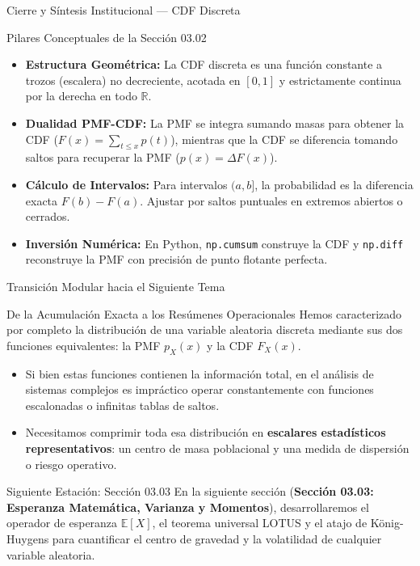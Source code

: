 \documentclass[10pt, aspectratio=169]{beamer}
\begin{document}
\begin{frame}{Cierre y Síntesis Institucional — CDF Discreta}
  \fontsize{7.5pt}{9pt}\selectfont
  \begin{block}{Pilares Conceptuales de la Sección 03.02}
    \fontsize{7.5pt}{9pt}\selectfont
    \begin{itemize}\itemsep=0.12cm
      \item \textbf{Estructura Geométrica:} La CDF discreta es una función constante a trozos (escalera) no decreciente, acotada en $[0,1]$ y estrictamente continua por la derecha en todo $\mathbb{R}$.
      \item \textbf{Dualidad PMF-CDF:} La PMF se integra sumando masas para obtener la CDF ($F(x) = \sum_{t \le x} p(t)$), mientras que la CDF se diferencia tomando saltos para recuperar la PMF ($p(x) = \Delta F(x)$).
      \item \textbf{Cálculo de Intervalos:} Para intervalos $(a, b]$, la probabilidad es la diferencia exacta $F(b) - F(a)$. Ajustar por saltos puntuales en extremos abiertos o cerrados.
      \item \textbf{Inversión Numérica:} En Python, \texttt{np.cumsum} construye la CDF y \texttt{np.diff} reconstruye la PMF con precisión de punto flotante perfecta.
    \end{itemize}
  \end{block}
\end{frame}

\begin{frame}{Transición Modular hacia el Siguiente Tema}
  \fontsize{7.5pt}{9pt}\selectfont
  \begin{block}{De la Acumulación Exacta a los Resúmenes Operacionales}
    \fontsize{7.5pt}{9pt}\selectfont
    Hemos caracterizado por completo la distribución de una variable aleatoria discreta mediante sus dos funciones equivalentes: la PMF $p_X(x)$ y la CDF $F_X(x)$.
    \begin{itemize}\itemsep=0.12cm
      \item Si bien estas funciones contienen la información total, en el análisis de sistemas complejos es impráctico operar constantemente con funciones escalonadas o infinitas tablas de saltos.
      \item Necesitamos comprimir toda esa distribución en \textbf{escalares estadísticos representativos}: un centro de masa poblacional y una medida de dispersión o riesgo operativo.
    \end{itemize}
  \end{block}
  \vspace{-0.15cm}
  \pause
  \begin{alertblock}{Siguiente Estación: Sección 03.03}
    \fontsize{7.5pt}{9pt}\selectfont
    En la siguiente sección (\textbf{Sección 03.03: Esperanza Matemática, Varianza y Momentos}), desarrollaremos el operador de esperanza $\mathbb{E}[X]$, el teorema universal LOTUS y el atajo de König-Huygens para cuantificar el centro de gravedad y la volatilidad de cualquier variable aleatoria.
  \end{alertblock}
\end{frame}
\end{document}
